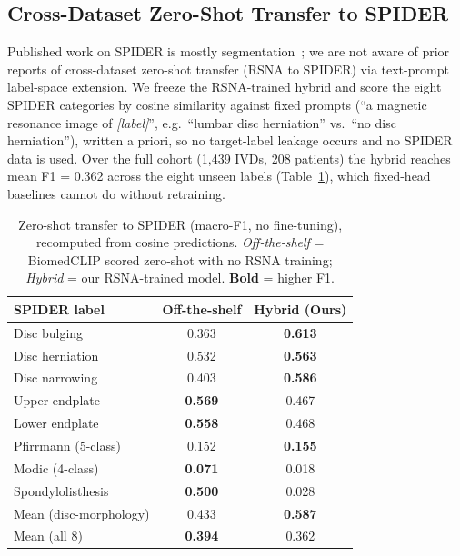 \documentclass[runningheads]{llncs}
\newcommand{\best}[1]{\textbf{#1}}
\begin{document}
\subsection{Cross-Dataset Zero-Shot Transfer to SPIDER}

Published work on SPIDER is mostly segmentation~\cite{vandergraaf2024spider}; we are not aware of prior reports of cross-dataset zero-shot transfer (RSNA to SPIDER) via text-prompt label-space extension. We freeze the RSNA-trained hybrid and score the eight SPIDER categories by cosine similarity against fixed prompts (``a magnetic resonance image of \emph{[label]}'', e.g.\ ``lumbar disc herniation'' vs.\ ``no disc herniation''), written a priori, so no target-label leakage occurs and no SPIDER data is used. Over the full cohort (1{,}439 IVDs, 208 patients) the hybrid reaches mean F1 = 0.362 across the eight unseen labels (Table~\ref{tab:spider}), which fixed-head baselines cannot do without retraining.

\begin{table}[htbp]
\centering
\caption{Zero-shot transfer to SPIDER (macro-F1, no fine-tuning), recomputed from cosine predictions. \emph{Off-the-shelf} = BiomedCLIP scored zero-shot with no RSNA training; \emph{Hybrid} = our RSNA-trained model. \textbf{Bold} = higher F1.}
\label{tab:spider}
\begin{tabular}{@{}lcc@{}}
\toprule
\textbf{SPIDER label}              & \textbf{Off-the-shelf} & \textbf{Hybrid (Ours)} \\
\midrule
Disc bulging              & 0.363 & \best{0.613} \\
Disc herniation           & 0.532 & \best{0.563} \\
Disc narrowing            & 0.403 & \best{0.586} \\
\midrule
Upper endplate            & \best{0.569} & 0.467 \\
Lower endplate            & \best{0.558} & 0.468 \\
Pfirrmann (5-class)       & 0.152 & \best{0.155} \\
Modic (4-class)           & \best{0.071} & 0.018 \\
Spondylolisthesis         & \best{0.500} & 0.028 \\
\midrule
Mean (disc-morphology)    & 0.433 & \best{0.587} \\
Mean (all 8)              & \best{0.394} & 0.362 \\
\bottomrule
\end{tabular}
\end{table}
\end{document}
